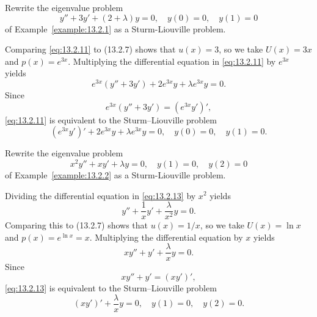 \setcounter{example}{2}
\setcounter{equation}{10}
\begin{example}
  \label{example:13.2.3} \rm Rewrite the eigenvalue problem
  \begin{equation}
    \label{eq:13.2.11}y''+3y'+(2+\lambda)y=0,\quad y(0)=0,\quad y(1)=0
  \end{equation}
  of Example~\ref{example:13.2.1} as a Sturm-Liouville problem.
\end{example}
\setcounter{equation}{11}
\begin{examplesolution}
\solution Comparing \eqref{eq:13.2.11} to \textup{(13.2.7)} shows that $u(x)=3$, so we take
$U(x)=3x$ and $p(x)=e^{3x}$. Multiplying the differential equation in \eqref{eq:13.2.11} by $e^{3x}$
yields
\[
  e^{3x}(y''+3y')+2e^{3x}y+\lambda e^{3x}y=0.
\]
Since
\[
  e^{3x}(y''+3y')=(e^{3x}y')',
\]
\eqref{eq:13.2.11} is equivalent to the Sturm--Liouville problem
\begin{equation}
  \label{eq:13.2.12}(e^{3x}y')'+2e^{3x}y+\lambda e^{3x}y=0,\quad y(0)=0,\quad y(1)=0.
\end{equation}
\end{examplesolution}

\setcounter{example}{3}
\setcounter{equation}{12}
\begin{example}
  \label{example:13.2.4} \rm Rewrite the eigenvalue problem
  \begin{equation}
    \label{eq:13.2.13}x^{2}y''+xy'+\lambda y=0,\quad y(1)=0,\quad y(2)=0
  \end{equation}
  of Example~\ref{example:13.2.2} as a Sturm-Liouville problem.
\end{example}
\setcounter{equation}{13}
\begin{examplesolution}
\solution Dividing the differential equation in \eqref{eq:13.2.13} by $x^{2}$ yields
\[
  y''+\frac{1}{x}y'+\frac{\lambda}{x^{2}}y=0.
\]
Comparing this to \textup{(13.2.7)} shows that $u(x)=1/x$, so we take $U(x)=\ln x$ and
$p(x)=e^{\ln x}=x$. Multiplying the differential equation by $x$ yields
\[
  xy''+y'+\frac{\lambda}{x}y=0.
\]
Since
\[
  xy''+y'=(xy')',
\]
\eqref{eq:13.2.13} is equivalent to the Sturm--Liouville problem
\begin{equation}
  \label{eq:13.2.14}(xy')'+\frac{\lambda}{x}y=0,\quad y(1)=0,\quad y(2)=0.
\end{equation}
\bbox
\end{examplesolution}

